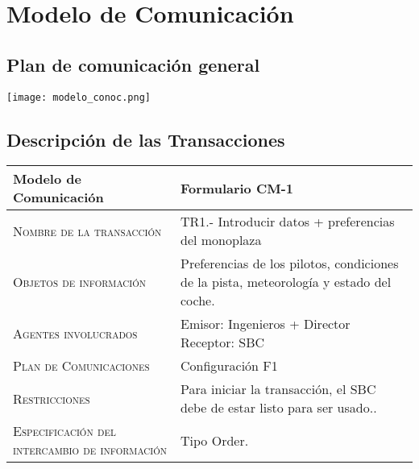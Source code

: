 \documentclass[12pt,a4paper,twoside,spanish]{article}      %
\begin{document}
\section{Modelo de Comunicación}

\subsection{Plan de comunicación general}

\vspace*{-1cm}
\begin{center}
    \texttt{[image: modelo\_conoc.png]}
\end{center}


\subsection{Descripción de las Transacciones}


\begin{table}[H]
\scriptsize
\begin{tabularx}{\textwidth}{|l|X|} \hline
\textbf{Modelo de Comunicación} & \textbf{Formulario CM-1} \\ \hline\hline

\textsc{Nombre de la transacción} & TR1.- Introducir datos + preferencias del monoplaza

\\ \hline
\textsc{Objetos de información} &
    Preferencias de los pilotos, condiciones de la pista, meteorología y estado del coche.
\\ \hline
\textsc{Agentes involucrados} &  Emisor: Ingenieros + Director
                                 Receptor: SBC\\ \hline
\textsc{Plan de Comunicaciones} &  Configuración F1
\\ \hline
\textsc{Restricciones} &  Para iniciar la transacción, el SBC debe de estar listo para ser usado.. \\ \hline
\textsc{Especificación del intercambio de información} &  Tipo Order.\\ \hline
\end{tabularx}
  \label{tab.CM1_1}
\end{table}
\end{document}
